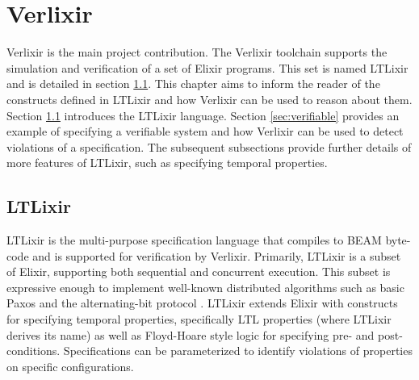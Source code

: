 \chapter{Verlixir} \label{chap:verlixir}
Verlixir is the main project contribution. The Verlixir toolchain supports the simulation and verification of a set of Elixir programs. This set is named LTLixir and is detailed in section \ref{sec:ltlixir}. This chapter aims to inform the reader of the constructs defined in LTLixir and how Verlixir can be used to reason about them. Section \ref{sec:ltlixir} introduces the LTLixir language. Section \ref{sec:verifiable} provides an example of specifying a verifiable system and how Verlixir can be used to detect violations of a specification. The subsequent subsections provide further details of more features of LTLixir, such as specifying temporal properties.
\section{LTLixir} \label{sec:ltlixir}
LTLixir is the multi-purpose specification language that compiles to BEAM byte-code and is supported for verification by Verlixir. Primarily, LTLixir is a subset of Elixir, supporting both sequential and concurrent execution. This subset is expressive enough to implement well-known distributed algorithms such as basic Paxos \cite{basic_paxos} and the alternating-bit protocol \cite{ab_protocol}. LTLixir extends Elixir with constructs for specifying temporal properties, specifically LTL properties (where LTLixir derives its name) as well as Floyd-Hoare style logic for specifying pre- and post-conditions. Specifications can be parameterized to identify violations of properties on specific configurations. 
\\ \\
